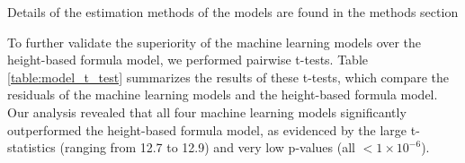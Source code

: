 \documentclass[11pt]{article}
\begin{document}
\begin{table}[h]
\caption{Comparison of Mean Squared Error of Machine Learning Models and Formula-Based Models}
\label{table:model_comparison}
\begin{threeparttable}
\renewcommand{\TPTminimum}{\linewidth}
\begin{tablenotes}
\footnotesize
\item Details of the estimation methods of the models are found in the methods section
\end{tablenotes}
\end{threeparttable}
\end{table}


To further validate the superiority of the machine learning models over the height-based formula model, we performed pairwise t-tests. Table \ref{table:model_t_test} summarizes the results of these t-tests, which compare the residuals of the machine learning models and the height-based formula model. Our analysis revealed that all four machine learning models significantly outperformed the height-based formula model, as evidenced by the large t-statistics (ranging from 12.7 to 12.9) and very low p-values (all $<$$1 \times 10^{-6}$).
\end{document}
